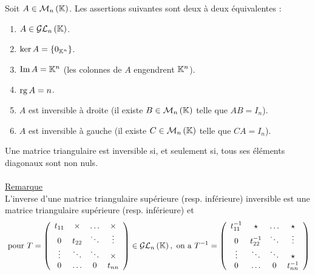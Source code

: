 \begin{defprop}
    Soit \(A \in \M{n}\).
    Les assertions suivantes sont deux à deux équivalentes :
    \begin{enumerate}
        \item \(A \in \GL{n}\).
        \item \(\ker A = \left\lbrace0_{\mathbb{K}^n} \right\rbrace\).
        \item \(\operatorname{Im} A = \mathbb{K}^n\) (\ie les colonnes de \(A\) engendrent \(\mathbb{K}^n\)).
        \item \(\operatorname{rg} A = n\).
        \item \(A\) est inversible à droite (\ie il existe \(B \in \M{n} \) telle que \(AB = I_n\)).
        \item \(A\) est inversible à gauche (\ie il existe \(C \in \M{n} \) telle que \(CA = I_n\)).
    \end{enumerate}
\end{defprop}
\begin{defprop}
    Une matrice triangulaire est inversible si, et seulement si, tous ses éléments diagonaux sont non nuls.\\~\\
    \underline{Remarque} \\
    L’inverse d’une matrice triangulaire supérieure (resp. inférieure) inversible est une matrice triangulaire supérieure (resp. inférieure) et 
    \[\text{ pour }T =\left(
    \begin{array}{cccc}
    t_{11} & \times & \dots & \times \\
    0      & t_{22} & \ddots &   \vdots     \\
    \vdots & \ddots & \ddots & \times \\
    0      & \dots  & 0 & t_{nn}
    \end{array}
    \right) \in \GL{n},\text{ on a }T^{-1} =\left(
    \begin{array}{cccc}
    t_{11}^{-1} & \star & \dots & \star \\
    0      & t_{22}^{-1} & \ddots &   \vdots     \\
    \vdots & \ddots & \ddots & \star \\
    0      & \dots  & 0 & t_{nn}^{-1}
    \end{array}
    \right)\]
\end{defprop}

